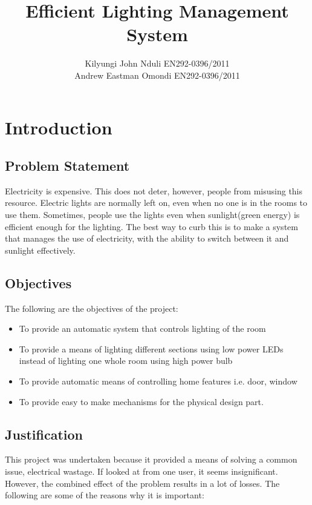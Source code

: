 \documentclass[oneside,notitlepage]{book}
\begin{document}
\title{Efficient Lighting Management System}
\author{Kilyungi John Nduli EN292-0396/2011 \\ Andrew Eastman Omondi EN292-0396/2011}
\maketitle

\tableofcontents

\chapter{Introduction}
\section{Problem Statement}
Electricity is expensive. This does not deter, however, people from misusing this resource. Electric lights are normally left on, even when no one is in the rooms to use them. Sometimes, people use the lights even when sunlight(green energy) is efficient enough for the lighting. The best way to curb this is to make a system that manages the use of electricity, with the ability to switch between it and sunlight effectively.

\section{Objectives}
The following are the objectives of the project:
\begin{itemize}

\item To provide an automatic system that controls lighting of the room
\item To provide a means of lighting different sections using low power LEDs instead of lighting one whole room using high power bulb
\item To provide automatic means of controlling home features i.e. door, window
\item To provide easy to make mechanisms for the physical design part.

\end{itemize}

\section{Justification}
This project was undertaken because it provided a means of solving a common issue, electrical wastage. If looked at from one user, it seems insignificant. However, the combined effect of the problem results in a lot of losses. The following are some of the reasons why it is important:
\end{document}
